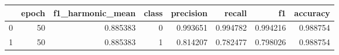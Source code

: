\begin{tabular}{lrrrrrrr}
\toprule
 & epoch & f1_harmonic_mean & class & precision & recall & f1 & accuracy \\
\midrule
0 & 50 & 0.885383 & 0 & 0.993651 & 0.994782 & 0.994216 & 0.988754 \\
1 & 50 & 0.885383 & 1 & 0.814207 & 0.782477 & 0.798026 & 0.988754 \\
\bottomrule
\end{tabular}
